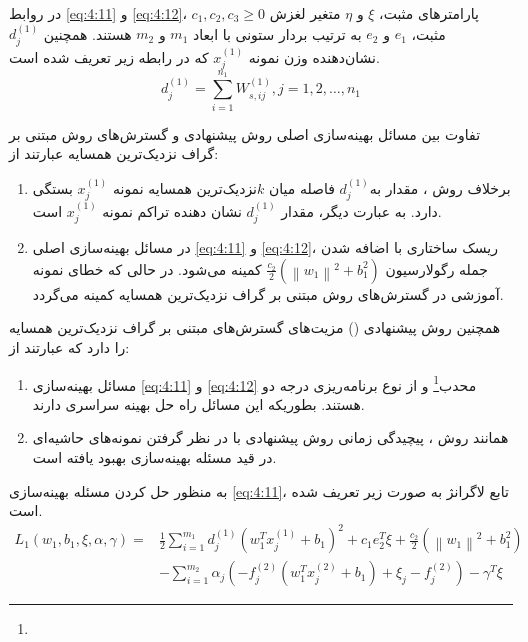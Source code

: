 در روابط \ref{eq:4:11} و  \ref{eq:4:12}،  $c_{1},c_{2},c_{3} \geq 0$ پارامترهای مثبت، $\xi $ و  $\eta$ متغیر لغزش مثبت،    $e_{1}$ و  $e_{2}$ به ترتیب بردار ستونی با ابعاد  $m_{1}$ و $m_{2}$  هستند. همچنین  $d^{(1)}_{j}$ نشان‌دهنده وزن نمونه   $x^{(1)}_{j}$ که در رابطه زیر تعریف شده است.
\begin{equation}\label{eq:4:13}
d^{(1)}_{j}=\sum^{n_1}_{i=1} W^{(1)}_{s,ij},j=1,2,\dots,n_1
\end{equation}

تفاوت بین مسائل بهینه‌سازی اصلی روش پیشنهادی و گسترش‌های روش  مبتنی بر گراف نزدیک‌ترین همسایه عبارتند از:

\begin{enumerate}
	\item برخلاف روش ، مقدار   به$d^{(1)}_{j}$ فاصله میان  $k$نزدیک‌ترین همسایه نمونه  $x^{(1)}_{j}$ بستگی دارد. به عبارت دیگر، مقدار  $d^{(1)}_{j}$ نشان دهنده تراکم نمونه $x^{(1)}_{j}$  است.
	\item در مسائل بهینه‌سازی اصلی  \ref{eq:4:11} و \ref{eq:4:12}، ریسک ساختاری با اضافه شدن جمله رگولارسیون   $\frac{c_{2}}{2}(\left\|w_{1}\right\|^{2}+b^{2}_{1})$ کمینه می‌شود. در حالی که خطای نمونه آموزشی در گسترش‌های روش  مبتنی بر گراف نزدیک‌ترین همسایه کمینه می‌گردد.
\end{enumerate}

همچنین روش پیشنهادی () مزیت‌های گسترش‌های مبتنی بر گراف نزدیک‌ترین همسایه را دارد که عبارتند از:
\begin{enumerate}
	\item مسائل بهینه‌سازی \ref{eq:4:11} و \ref{eq:4:12} محدب\footnote{} و از نوع برنامه‌ریزی درجه دو هستند. بطوریکه این مسائل راه حل بهینه سراسری دارند.
	\item همانند روش ، پیچیدگی زمانی روش پیشنهادی با در نظر گرفتن نمونه‌های حاشیه‌ای در قید مسئله بهینه‌سازی بهبود یافته است.
\end{enumerate}

به منظور حل کردن مسئله بهینه‌سازی \ref{eq:4:11}، تابع لاگرانژ به صورت زیر تعریف شده است.
\begin{equation}
\begin{split}
L_{1}(w_{1},b_{1},\xi, \alpha, \gamma)= &\frac{1}{2}\sum\limits_{i=1}^{m_{1}}{d^{(1)}_{j}(w^{T}_{1}x^{(1)}_{j}+b_{1})^{2}}+c_{1}e_{2}^{T}\xi+\frac{c_{2}}{2}(\left\|w_{1}\right\|^{2}+b^{2}_{1}) \\
& -\sum\limits_{i=1}^{m_{2}}{\alpha_{j}(-f^{(2)}_{j}(w^{T}_{1}x^{(2)}_{j}+b_{1})+\xi_{j} - f^{(2)}_{j})} - \gamma^{T}\xi
\end{split}
\label{eq:4:14}
\end{equation}


